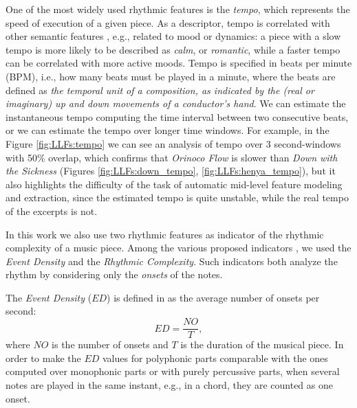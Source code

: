 One of the most widely used rhythmic features is the \textit{tempo}, which represents the speed of execution of a given piece. As a descriptor, tempo is correlated with other semantic features \cite{Buccoli2013}, e.g., related to mood or dynamics: a piece with a slow tempo is more likely to be described as \textit{calm}, or \textit{romantic}, while a faster tempo can be correlated with more active moods. Tempo is specified in beats per minute (BPM), i.e., how many beats must be played in a minute, where the beats are defined as  \textit{the temporal unit of a composition, as indicated by the (real or imaginary) up and down movements of a conductor's hand}\cite{harvardDictionary}. We can estimate the instantaneous tempo computing the time interval between two consecutive beats, or we can estimate the tempo over longer time windows. For example, in the Figure \ref{fig:LLFs:tempo} we can see an analysis of tempo over 3 second-windows with 50\% overlap, which confirms that \textit{Orinoco Flow} is slower than \textit{Down with the Sickness} (Figures \ref{fig:LLFs:down_tempo}, \ref{fig:LLFs:henya_tempo}), but it also highlights the difficulty of the task of automatic mid-level feature modeling and extraction, since the estimated tempo is quite unstable, while the real tempo of the excerpts is not. 


In this work we also use two rhythmic features as indicator of the rhythmic complexity of a music piece. Among the various proposed indicators \cite{shmulevich2000}, we used the \textit{Event Density} and the \textit{Rhythmic Complexity}. %
Such indicators both analyze the rhythm by considering only the \textit{onsets} of the notes. %

The \textit{Event Density} ($ED$) is defined in \cite{Lartillot2007} as the average number of onsets per second:
\begin{equation}
ED = \frac{NO}{T},
\label{eq:LLFs:ED}
\end{equation}
where $NO$ is the number of onsets and $T$ is the duration of the musical piece. In order to 
make the $ED$ values for polyphonic parts comparable with the ones computed over monophonic parts or with purely percussive parts, when several notes are played in the same instant, e.g., in a chord, they are counted as one onset.  

